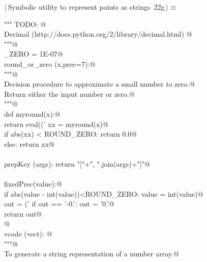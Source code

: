 \documentclass[11pt,oneside]{article}	%
\begin{document}
\begin{flushleft} \small \label{scrap48}
\protect{}$\langle\,$Symbolic utility to represent points as strings\nobreak\ {\footnotesize 22g}$\,\rangle\equiv$
\vspace{-1ex}
\begin{list}{}{} \item
\mbox{}\verb@""" TODO: @\\
\mbox{}\verb@use Decimal (http://docs.python.org/2/library/decimal.html) @\\
\mbox{}\verb@"""@\\
\mbox{}\verb@ROUND_ZERO = 1E-07@\\
\mbox{}\verb@def round_or_zero (x,prec=7):@\\
\mbox{}\verb@   """@\\
\mbox{}\verb@   Decision procedure to approximate a small number to zero.@\\
\mbox{}\verb@   Return either the input number or zero.@\\
\mbox{}\verb@   """@\\
\mbox{}\verb@   def myround(x):@\\
\mbox{}\verb@      return eval(('%.'+str(prec)+'f') % round(x,prec))@\\
\mbox{}\verb@   xx = myround(x)@\\
\mbox{}\verb@   if abs(xx) < ROUND_ZERO: return 0.0@\\
\mbox{}\verb@   else: return xx@\\
\mbox{}\verb@@\\
\mbox{}\verb@def prepKey (args): return "["+", ".join(args)+"]"@\\
\mbox{}\verb@@\\
\mbox{}\verb@def fixedPrec(value):@\\
\mbox{}\verb@   if abs(value - int(value))<ROUND_ZERO: value = int(value)@\\
\mbox{}\verb@   out = ('%0.7f'% value).rstrip('0')@\\
\mbox{}\verb@   if out == '-0.': out = '0.'@\\
\mbox{}\verb@   return out@\\
\mbox{}\verb@   @\\
\mbox{}\verb@def vcode (vect): @\\
\mbox{}\verb@   """@\\
\mbox{}\verb@   To generate a string representation of a number array.@\\

\end{list}
\end{flushleft}
\end{document}
